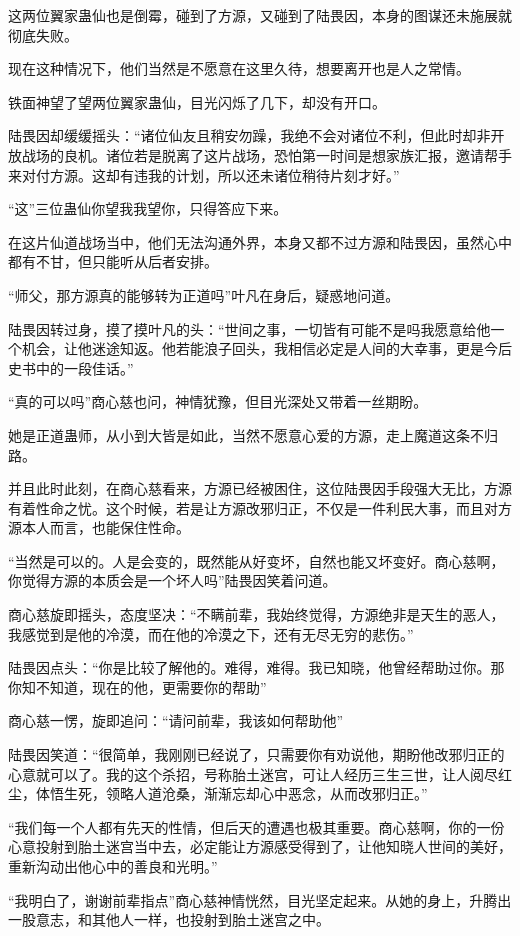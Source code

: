 \begin{this_body}
这两位翼家蛊仙也是倒霉，碰到了方源，又碰到了陆畏因，本身的图谋还未施展就彻底失败。

现在这种情况下，他们当然是不愿意在这里久待，想要离开也是人之常情。

铁面神望了望两位翼家蛊仙，目光闪烁了几下，却没有开口。

陆畏因却缓缓摇头：“诸位仙友且稍安勿躁，我绝不会对诸位不利，但此时却非开放战场的良机。诸位若是脱离了这片战场，恐怕第一时间是想家族汇报，邀请帮手来对付方源。这却有违我的计划，所以还未诸位稍待片刻才好。”

“这”三位蛊仙你望我我望你，只得答应下来。

在这片仙道战场当中，他们无法沟通外界，本身又都不过方源和陆畏因，虽然心中都有不甘，但只能听从后者安排。

“师父，那方源真的能够转为正道吗”叶凡在身后，疑惑地问道。

陆畏因转过身，摸了摸叶凡的头：“世间之事，一切皆有可能不是吗我愿意给他一个机会，让他迷途知返。他若能浪子回头，我相信必定是人间的大幸事，更是今后史书中的一段佳话。”

“真的可以吗”商心慈也问，神情犹豫，但目光深处又带着一丝期盼。

她是正道蛊师，从小到大皆是如此，当然不愿意心爱的方源，走上魔道这条不归路。

并且此时此刻，在商心慈看来，方源已经被困住，这位陆畏因手段强大无比，方源有着性命之忧。这个时候，若是让方源改邪归正，不仅是一件利民大事，而且对方源本人而言，也能保住性命。

“当然是可以的。人是会变的，既然能从好变坏，自然也能又坏变好。商心慈啊，你觉得方源的本质会是一个坏人吗”陆畏因笑着问道。

商心慈旋即摇头，态度坚决：“不瞒前辈，我始终觉得，方源绝非是天生的恶人，我感觉到是他的冷漠，而在他的冷漠之下，还有无尽无穷的悲伤。”

陆畏因点头：“你是比较了解他的。难得，难得。我已知晓，他曾经帮助过你。那你知不知道，现在的他，更需要你的帮助”

商心慈一愣，旋即追问：“请问前辈，我该如何帮助他”

陆畏因笑道：“很简单，我刚刚已经说了，只需要你有劝说他，期盼他改邪归正的心意就可以了。我的这个杀招，号称胎土迷宫，可让人经历三生三世，让人阅尽红尘，体悟生死，领略人道沧桑，渐渐忘却心中恶念，从而改邪归正。”

“我们每一个人都有先天的性情，但后天的遭遇也极其重要。商心慈啊，你的一份心意投射到胎土迷宫当中去，必定能让方源感受得到了，让他知晓人世间的美好，重新沟动出他心中的善良和光明。”

“我明白了，谢谢前辈指点”商心慈神情恍然，目光坚定起来。从她的身上，升腾出一股意志，和其他人一样，也投射到胎土迷宫之中。


\end{this_body}
